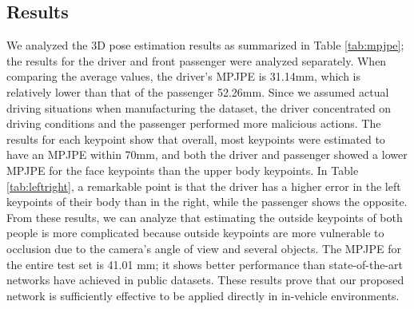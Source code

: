 \documentclass[letterpaper]{article} %
\begin{document}
\begin{table}[t]
\centering
{}
\caption{Entire network performance evaluation.}
\label{tab:other}
\end{table}

\subsection{Results}
We analyzed the 3D pose estimation results as summarized in Table \ref{tab:mpjpe}; the results for the driver and front passenger were analyzed separately. When comparing the average values, the driver's MPJPE is 31.14mm, which is relatively lower than that of the passenger 52.26mm. Since we assumed actual driving situations when manufacturing the dataset, the driver concentrated on driving conditions and the passenger performed more malicious actions. The results for each keypoint show that overall, most keypoints were estimated to have an MPJPE within 70mm, and both the driver and passenger showed a lower MPJPE for the face keypoints than the upper body keypoints. In Table \ref{tab:leftright}, a remarkable point is that the driver has a higher error in the left keypoints of their body than in the right, while the passenger shows the opposite. From these results, we can analyze that estimating the outside keypoints of both people is more complicated because outside keypoints are more vulnerable to occlusion due to the camera's angle of view and several objects. The MPJPE for the entire test set is 41.01 mm; it shows better performance than state-of-the-art networks have achieved in public datasets. These results prove that our proposed network is sufficiently effective to be applied directly in in-vehicle environments.
\end{document}
